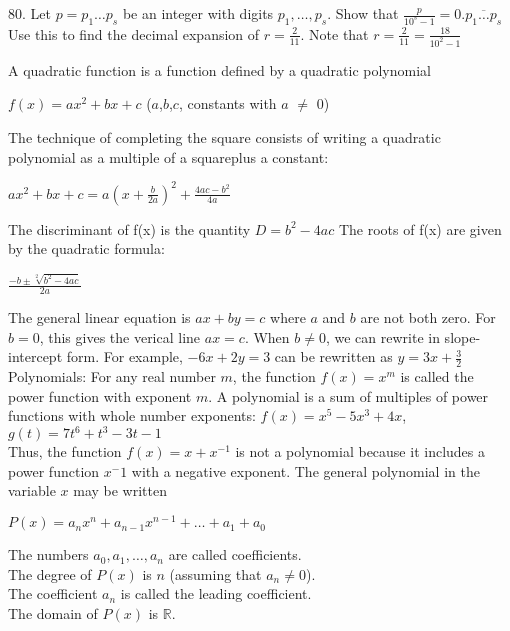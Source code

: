 \documentclass{article}
\begin{document}
\newpage

80. Let $p = p_1 \dots p_s$ be an integer with digits $p_1, \dots, p_s$. Show that $\frac{p}{10^s - 1} = 0.\overline{p_1 \dots p_s}$ Use this to find the decimal expansion of $r = \frac{2}{11}$. Note that $r = \frac{2}{11} = \frac{18}{10^2 - 1}$

\newpage

A quadratic function is a function defined by a quadratic polynomial\\
\begin{center}$f(x) = ax^2 + bx + c$ ($a$,$b$,$c$, constants with $a$ $\neq$ 0)\\\end{center}

The technique of completing the square consists of writing a quadratic polynomial as a multiple of a squareplus a constant:\\
\begin{center}$ax^2 + bx + c = a(x + \frac{b}{2a})^2 + \frac{4ac-b^2}{4a}$\\\end{center}

The discriminant of f(x) is the quantity $D = b^2 - 4ac$ The roots of f(x) are given by the quadratic formula:\\
\begin{center}$\frac{-b \pm \sqrt[2]{b^2 - 4ac}}{2a}$ \end{center}

The general linear equation is $ax + by = c$ where $a$ and $b$ are not both zero. For $b = 0$, this gives the verical line $ax = c$. When $b \neq 0$, we can rewrite in slope-intercept form. For example, $-6x + 2y =3$ can be rewritten as $y = 3x + \frac{3}{2}$\\

Polynomials: For any real number $m$, the function $f(x) = x^m$ is called the power function with exponent $m$. A polynomial is a sum of multiples of power functions with whole number exponents: $f(x) = x^5 -5x^3 + 4x$, $g(t) = 7t^6 +t^3 - 3t -1$\\

Thus, the function $f(x) = x + x^{-1}$ is not a polynomial because it includes a power function $x^-1$ with a negative exponent. The general polynomial in the variable $x$ may be written\\
\begin{center}$P(x) = a_nx^n + a_{n-1}x^{n-1} + \dots + a_1 + a_0$\end{center}
The numbers $a_0, a_1, \dots, a_n$ are called coefficients.\\
The degree of $P(x)$ is $n$ (assuming that $a_n \neq 0$).\\
The coefficient $a_n$ is called the leading coefficient.\\
The domain of $P(x)$ is $\mathbb{R}$.\\
\end{document}

